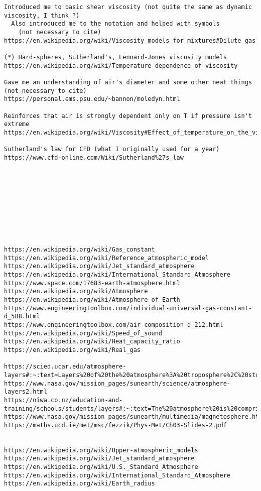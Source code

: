 \documentclass[11pt,dvipsnames]{thesis}
\begin{document}
\begin{verbatim}
Introduced me to basic shear viscosity (not quite the same as dynamic viscosity, I think ?)
  Also introduced me to the notation and helped with symbols
  	(not necessary to cite)
https://en.wikipedia.org/wiki/Viscosity_models_for_mixtures#Dilute_gas_limit_and_scaled_variables

(*) Hard-spheres, Sutherland's, Lennard-Jones viscosity models
https://en.wikipedia.org/wiki/Temperature_dependence_of_viscosity

Gave me an understanding of air's diameter and some other neat things (not necessary to cite)
https://personal.ems.psu.edu/~bannon/moledyn.html

Reinforces that air is strongly dependent only on T if pressure isn't extreme
https://en.wikipedia.org/wiki/Viscosity#Effect_of_temperature_on_the_viscosity_of_a_gas

Sutherland's law for CFD (what I originally used for a year)
https://www.cfd-online.com/Wiki/Sutherland%27s_law










https://en.wikipedia.org/wiki/Gas_constant
https://en.wikipedia.org/wiki/Reference_atmospheric_model
https://en.wikipedia.org/wiki/Jet_standard_atmosphere
https://en.wikipedia.org/wiki/International_Standard_Atmosphere
https://www.space.com/17683-earth-atmosphere.html
https://en.wikipedia.org/wiki/Atmosphere
https://en.wikipedia.org/wiki/Atmosphere_of_Earth
https://www.engineeringtoolbox.com/individual-universal-gas-constant-d_588.html
https://www.engineeringtoolbox.com/air-composition-d_212.html
https://en.wikipedia.org/wiki/Speed_of_sound
https://en.wikipedia.org/wiki/Heat_capacity_ratio
https://en.wikipedia.org/wiki/Real_gas

https://scied.ucar.edu/atmosphere-layers#:~:text=Layers%20of%20the%20atmosphere%3A%20troposphere%2C%20stratosphere%2C%20mesosphere%20and,named%20the%20troposphere%2C%20stratosphere%2C%20mesosphere%2C%20thermosphere%20and%20exosphere.
https://www.nasa.gov/mission_pages/sunearth/science/atmosphere-layers2.html
https://niwa.co.nz/education-and-training/schools/students/layers#:~:text=The%20atmosphere%20is%20comprised%20of%20layers%20based%20on,above%20the%20Earth%27s%20surface%20is%20called%20the%20exosphere.
https://www.nasa.gov/mission_pages/sunearth/multimedia/magnetosphere.html
https://maths.ucd.ie/met/msc/fezzik/Phys-Met/Ch03-Slides-2.pdf


https://en.wikipedia.org/wiki/Upper-atmospheric_models
https://en.wikipedia.org/wiki/Jet_standard_atmosphere
https://en.wikipedia.org/wiki/U.S._Standard_Atmosphere
https://en.wikipedia.org/wiki/International_Standard_Atmosphere
https://en.wikipedia.org/wiki/Earth_radius


\end{verbatim}
\end{document}
